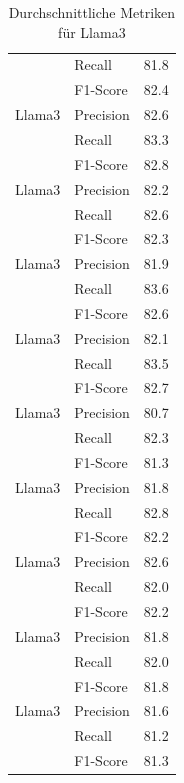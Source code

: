 \begin{table}[!ht]
\begin{tabular}{llr}
        & Recall & 81.8 \\
        & F1-Score & 82.4 \\
        \midrule
        Llama3 & Precision & 82.6 \\
        & Recall & 83.3 \\
        & F1-Score & 82.8 \\
        \midrule
        Llama3 & Precision & 82.2 \\
        & Recall & 82.6 \\
        & F1-Score & 82.3 \\
        \midrule
        Llama3 & Precision & 81.9 \\
        & Recall & 83.6 \\
        & F1-Score & 82.6 \\
        \midrule
        Llama3 & Precision & 82.1 \\
        & Recall & 83.5 \\
        & F1-Score & 82.7 \\
        \midrule
        Llama3 & Precision & 80.7 \\
        & Recall & 82.3 \\
        & F1-Score & 81.3 \\
        \midrule
        Llama3 & Precision & 81.8 \\
        & Recall & 82.8 \\
        & F1-Score & 82.2 \\
        \midrule
        Llama3 & Precision & 82.6 \\
        & Recall & 82.0 \\
        & F1-Score & 82.2 \\
        \midrule
        Llama3 & Precision & 81.8 \\
        & Recall & 82.0 \\
        & F1-Score & 81.8 \\
        \midrule
        Llama3 & Precision & 81.6 \\
        & Recall & 81.2 \\
        & F1-Score & 81.3 \\
        \bottomrule
    \end{tabular}
    \caption{Durchschnittliche Metriken für Llama3}
    \label{tab:average_metrics_llama3}
\end{table}